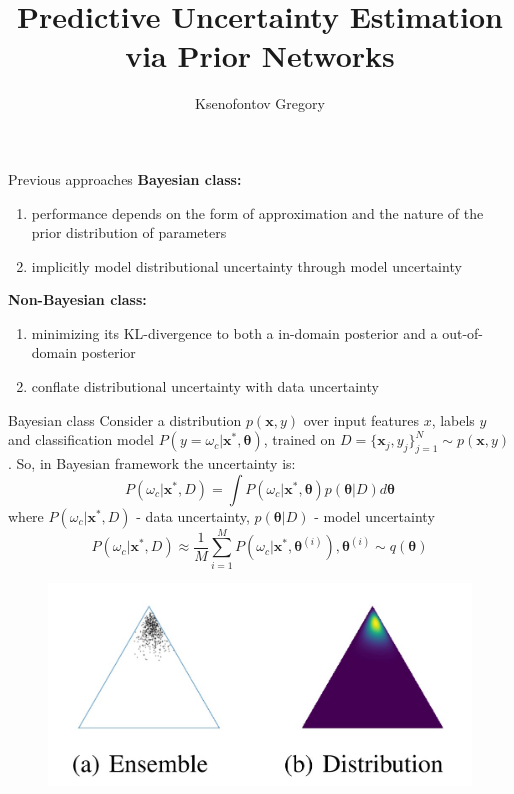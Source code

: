 \documentclass{beamer}
\title{Predictive Uncertainty Estimation via Prior Networks}
\author{Ksenofontov Gregory}
\institute{MIPT}
\begin{document}
\begin{frame}
    \titlepage
\end{frame}

\begin{frame}{Previous approaches}
\textbf{Bayesian class:} 
    \begin{enumerate}
        \item performance depends on the form of approximation and the nature of the prior distribution of parameters
        \item implicitly model distributional uncertainty through model uncertainty
    \end{enumerate}
    \textbf{Non-Bayesian class:}
    \begin{enumerate}
        \item minimizing its KL-divergence to both a in-domain posterior and a out-of-domain posterior
        \item conflate distributional uncertainty with data uncertainty
    \end{enumerate}
\end{frame}
\begin{frame}{Bayesian class}
     Consider a distribution $p(\mathbf{x}, y)$ over input features $x$, labels $y$ and classification model $P(y = \omega_c | \mathbf{x}^*, \mathbf{\theta})$, trained on $D = \{\mathbf{x}_j, y_j\}_{j=1}^N \sim p(\mathbf{x}, y)$. So, in Bayesian framework the uncertainty is:
     $$P(\omega_c | \mathbf{x}^*, D) = \int P(\omega_c | \mathbf{x}^*, \mathbf{\theta})p(\mathbf{\theta}|D) d\mathbf{\theta}$$
     where $P(\omega_c | \mathbf{x}^*, D)$ - data uncertainty,
     $p(\mathbf{\theta}|D)$ - model uncertainty
     $$P(\omega_c | \mathbf{x}^*, D) \approx \frac{1}{M}\sum_{i=1}^MP(\omega_c | \mathbf{x}^*, \mathbf{\theta}^{(i)}), \mathbf{\theta}^{(i)} \sim q(\mathbf{\theta})$$
     \begin{figure}[h]
        \includegraphics[scale=0.25]{ensamble.jpg}
     \end{figure}
\end{frame}
\end{document}
